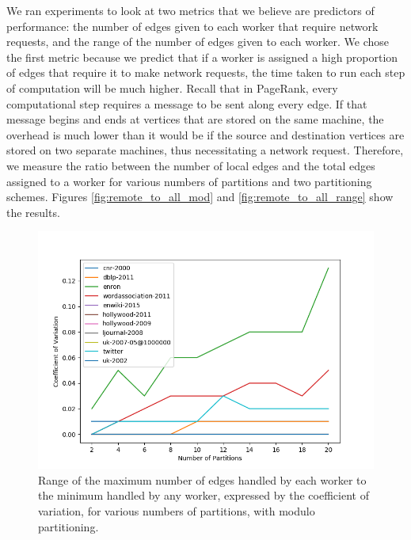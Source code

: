 We ran experiments to look at two metrics that we believe are predictors of 
performance: the number of edges given to each worker that require network 
requests, and the range of the number of edges given to each worker. We chose 
the first metric because we predict that if a worker is assigned a high 
proportion of edges that require it to make network requests, the time taken to 
run each step of computation will be much higher. Recall that in PageRank, 
every computational step requires a message to be sent along every edge. If 
that message begins and ends at vertices that are stored on the same machine, 
the overhead is much lower than it would be if the source and destination 
vertices are stored on two separate machines, thus necessitating a network 
request. Therefore, we measure the ratio between the number of local edges and 
the total edges assigned to a worker for various numbers of partitions and two 
partitioning schemes. Figures \ref{fig:remote_to_all_mod} and 
\ref{fig:remote_to_all_range} show the results.

\begin{figure}
	\centering
	\includegraphics[width=\columnwidth]{../good_plots/range_as_cv_modulo.png}
	\caption{Range of the maximum number of edges handled by each worker to the 
		minimum handled by any worker, expressed by the coefficient of 
		variation, 
		for various numbers of partitions, with modulo partitioning.}
	\label{fig:cv_mod}
\end{figure}

